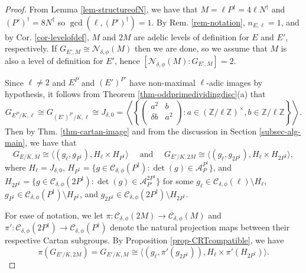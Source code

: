 \documentclass[11pt]{amsart}
\theoremstyle{definition}
\newcommand{\Z}{\mathbb{Z}}
\begin{document}
\begin{proof}
    From Lemma \ref{lem-structureofN}, we have that $M = \ell P^{\dagger} = 4 \ell N^{\dagger}$ and $(P')^{\dagger} = 8 N^{\dagger}$ so $\gcd(\ell, (P')^{\dagger}) = 1$. By Rem. \ref{rem-notation}, $n_{E, \ell} = 1$, and by Cor. \ref{cor-levelofdef}, $M$ and $2M$ are adelic levels of definition for $E$ and $E'$, respectively. If $G_{E', M} \cong \mathcal{N}_{\delta, \phi}(M)$ then we are done, so we assume that $M$ is also a level of definition for $E'$, hence $[\mathcal{N}_{\delta, \phi}(M) : G_{E', M}] = 2$.

    Since $\ell \neq 2$ and $E^P$ and $(E')^{P'}$ have non-maximal $\ell$-adic images by hypothesis, it follows from Theorem \ref{thm-oddprimedividingdisc}(a) that 
    \[ G_{E^P/K, \ell} \cong G_{(E')^{P'}/K, \ell} \cong J_{\delta, 0} = \left\langle \left\{ \left(\begin{array}{cc} a^2 & b\\ \delta b & a^2 \\ \end{array}\right): a \in (\Z/\ell\Z)^\times, b \in \Z/\ell\Z \right\} \right\rangle. \]
 Then by Thm. \ref{thm-cartan-image} and from the discussion in Section \ref{subsec-alg-main}, we have that
    \[ G_{E/K, M} \cong \langle (g_{\ell}, g_{P^{\dagger}}), H_{\ell} \times H_{P^{\dagger}} \rangle \quad \text{ and } \quad
 G_{E'/K, 2M} \cong \langle (g_{\ell}, g_{2P^{\dagger}}), H_{\ell} \times H_{2P^{\dagger}} \rangle, \]
    where $H_{\ell} = J_{\delta, 0}$, $H_{P^{\dagger}} = \{ g \in \mathcal{C}_{\delta, \phi}(P^{\dagger}) : \det(g) \in \mathcal{A}_{P}^{P^{\dagger}} \}$, and $H_{2P^{\dagger}} = \{ g \in \mathcal{C}_{\delta, \phi}(2P^{\dagger}) : \det(g) \in \mathcal{A}_{P'}^{2P^{\dagger}} \}$ for some $g_{\ell} \in \mathcal{C}_{\delta, \phi}(\ell) \setminus H_{\ell}$, $g_{P^{\dagger}} \in \mathcal{C}_{\delta, \phi}(P^{\dagger}) \setminus H_{P^{\dagger}}$, and $g_{2P^{\dagger}} \in \mathcal{C}_{\delta, \phi}(2P^{\dagger}) \setminus H_{2P^{\dagger}}$.

   For ease of notation, we let $\pi \colon \mathcal{C}_{\delta, \phi}(2M) \to \mathcal{C}_{\delta, \phi}(M)$ and $\pi' \colon \mathcal{C}_{\delta, \phi}(2P^{\dagger}) \to \mathcal{C}_{\delta, \phi}(P^\dagger)$ denote the natural projection maps between their respective Cartan subgroups.  By Proposition \ref{prop-CRTcompatible}, we have
   \[ \pi(G_{E'/K, 2M}) = G_{E'/K, M} \cong \langle (g_{\ell}, \pi'(g_{2P^{\dagger}})), H_{\ell} \times \pi'(H_{2P^{\dagger}}) \rangle. \]


\end{proof}
\end{document}
